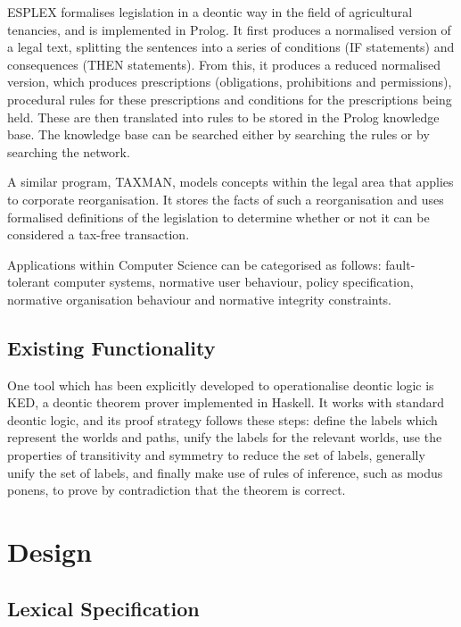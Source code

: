 \documentclass{l4proj}
\begin{document}
ESPLEX formalises legislation in a deontic way in the field of agricultural tenancies\cite{ESPLEX}, and is implemented in Prolog. It first produces a normalised version of a legal text, splitting the sentences into a series of conditions (IF statements) and consequences (THEN statements). From this, it produces a reduced normalised version, which produces prescriptions (obligations, prohibitions and permissions), procedural rules for these prescriptions and conditions for the prescriptions being held. These are then translated into rules to be stored in the Prolog knowledge base. The knowledge base can be searched either by searching the rules or by searching the network. 

A similar program, TAXMAN, models concepts within the legal area that applies to corporate reorganisation\cite{TAXMAN}. It stores the facts of such a reorganisation and uses formalised definitions of the legislation to determine whether or not it can be considered a tax-free transaction. 

Applications within Computer Science can be categorised as follows\cite{meyer93applications}: fault-tolerant computer systems, normative user behaviour, policy specification, normative organisation behaviour and normative integrity constraints. %

\section{Existing Functionality}%
One tool which has been explicitly developed to operationalise deontic logic is KED\cite{KED}, a deontic theorem prover implemented in Haskell. It works with standard deontic logic, and its proof strategy follows these steps: define the labels which represent the worlds and paths, unify the labels for the relevant worlds, use the properties of transitivity and symmetry to reduce the set of labels, generally unify the set of labels, and finally make use of rules of inference, such as modus ponens, to prove by contradiction that the theorem is correct. 

\chapter{Design}

\section{Lexical Specification}
\end{document}
